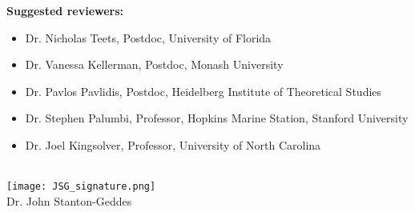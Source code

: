 \documentclass[letterpaper]{article}
\begin{document}
\textbf{Suggested reviewers:} 

\begin{itemize}
  \item{Dr. Nicholas Teets, Postdoc, University of Florida}
  \item{Dr. Vanessa Kellerman, Postdoc, Monash University}
  \item{Dr. Pavlos Pavlidis, Postdoc, Heidelberg Institute of Theoretical Studies}
  \item{Dr. Stephen Palumbi, Professor, Hopkins Marine Station, Stanford University}
  \item{Dr. Joel Kingsolver, Professor, University of North Carolina}
\end{itemize}



 \\
\texttt{[image: JSG\_signature.png]}  \\
Dr. John Stanton-Geddes
\end{document}
